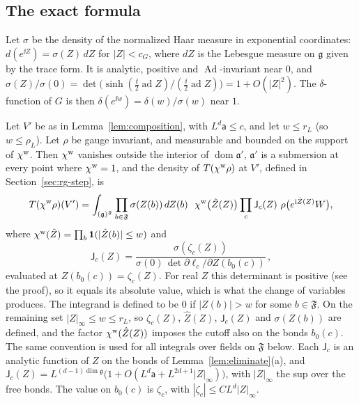 \subsection{The exact formula}

Let $\sigma$ be the density of the normalized Haar measure in exponential coordinates: $d(e^{\ii Z})=\sigma(Z)\,dZ$ for $|Z|<c_G$, where $dZ$ is the Lebesgue measure on $\mathfrak g$ given by the trace form. It is analytic, positive and $\operatorname{Ad}$-invariant near $0$, and $\sigma(Z)/\sigma(0)=\det\big(\sinh(\tfrac{\ii}{2}\operatorname{ad}Z)/(\tfrac{\ii}{2}\operatorname{ad}Z)\big)=1+O(|Z|^2)$. The $\delta$-function of $G$ is then $\delta(e^{\ii w})=\delta(w)/\sigma(w)$ near $1$.

\begin{proposition}\label{prop:exact-step}
Let $V'$ be as in Lemma~\ref{lem:composition}, with $L^d\mathsf a\le c$, and let $w\le r_L$ (so $w\le\rho_L$). Let $\rho$ be gauge invariant, and measurable and bounded on the support of $\chi^{\rm w}$. Then $\chi^{\rm w}$ vanishes outside the interior of $\operatorname{dom}\mathfrak a'$, $\mathfrak a'$ is a submersion at every point where $\chi^{\rm w}=1$, and the density of $T(\chi^{\rm w}\rho)$ at $V'$, defined in Section~\ref{sec:rg-step}, is
\[
T(\chi^{\rm w}\rho)(V')=\int_{(\mathfrak g)^{\mathfrak F}}\prod_{b\in\mathfrak F}\sigma(Z(b))\,dZ(b)\ \ \chi^{\rm w}\big(\hat Z(Z)\big)\prod_c\mathsf J_c(Z)\ \rho\big(e^{\mathrm i\hat Z(Z)}W\big),
\]
where $\chi^{\rm w}(\hat Z)=\prod_b\mathbf 1(|\hat Z(b)|\le w)$ and
\[
\mathsf J_c(Z)=\frac{\sigma(\zeta_c(Z))}{\sigma(0)\,\det\partial\ell_c/\partial Z(b_0(c))}\,,
\]
evaluated at $Z(b_0(c))=\zeta_c(Z)$. For real $Z$ this determinant is positive (see the proof), so it equals its absolute value, which is what the change of variables produces. The integrand is defined to be $0$ if $|Z(b)|>w$ for some $b\in\mathfrak F$. On the remaining set $|Z|_\infty\le w\le r_L$, so $\zeta_c(Z)$, $\hat Z(Z)$, $\mathsf J_c(Z)$ and $\sigma(Z(b))$ are defined, and the factor $\chi^{\rm w}(\hat Z(Z))$ imposes the cutoff also on the bonds $b_0(c)$. The same convention is used for all integrals over fields on $\mathfrak F$ below. Each $\mathsf J_c$ is an analytic function of $Z$ on the bonds of Lemma~\ref{lem:eliminate}(a), and $\mathsf J_c(Z)=L^{(d-1)\dim\mathfrak g}\big(1+O(L^d\mathsf a+L^{2d+1}|Z|_\infty)\big)$, with $|Z|_\infty$ the sup over the free bonds. The value on $b_0(c)$ is $\zeta_c$, with $|\zeta_c|\le CL^d|Z|_\infty$.
\end{proposition}

